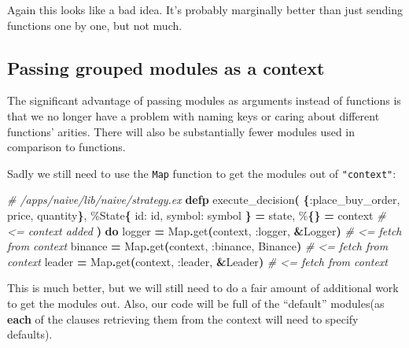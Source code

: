 \documentclass[
  oneside]{book}
\newenvironment{Shaded}{\begin{snugshade}}{\end{snugshade}}
\newcommand{\CommentTok}[1]{\textcolor[rgb]{0.56,0.35,0.01}{\textit{#1}}}
\newcommand{\ConstantTok}[1]{\textcolor[rgb]{0.56,0.35,0.01}{#1}}
\newcommand{\FunctionTok}[1]{\textcolor[rgb]{0.13,0.29,0.53}{\textbf{#1}}}
\newcommand{\KeywordTok}[1]{\textcolor[rgb]{0.13,0.29,0.53}{\textbf{#1}}}
\newcommand{\NormalTok}[1]{#1}
\newcommand{\OperatorTok}[1]{\textcolor[rgb]{0.81,0.36,0.00}{\textbf{#1}}}
\newcommand{\VariableTok}[1]{\textcolor[rgb]{0.00,0.00,0.00}{#1}}
\begin{document}
Again this looks like a bad idea. It's probably marginally better than just sending functions one by one, but not much.

\subsection{Passing grouped modules as a context}\label{passing-grouped-modules-as-a-context}

The significant advantage of passing modules as arguments instead of functions is that we no longer have a problem with naming keys or caring about different functions' arities. There will also be substantially fewer modules used in comparison to functions.

Sadly we still need to use the \texttt{Map} function to get the modules out of \texttt{"context"}:

\begin{Shaded}
\begin{Highlighting}[]
\CommentTok{\# /apps/naive/lib/naive/strategy.ex}
  \KeywordTok{defp}\NormalTok{ execute\_decision}\FunctionTok{(}
        \FunctionTok{\{}\VariableTok{:place\_buy\_order}\NormalTok{, price, quantity}\FunctionTok{\}}\NormalTok{,}
\NormalTok{        \%}\ConstantTok{State}\FunctionTok{\{}
          \VariableTok{id:}\NormalTok{ id,}
          \VariableTok{symbol:}\NormalTok{ symbol}
        \FunctionTok{\}} \OperatorTok{=}\NormalTok{ state,}
\NormalTok{        \%}\FunctionTok{\{\}} \OperatorTok{=}\NormalTok{ context }\CommentTok{\# \textless{}= context added}
      \FunctionTok{)} \KeywordTok{do}
\NormalTok{    logger }\OperatorTok{=} \ConstantTok{Map}\OperatorTok{.}\NormalTok{get}\FunctionTok{(}\NormalTok{context, }\VariableTok{:logger}\NormalTok{, }\OperatorTok{\&}\ConstantTok{Logger}\FunctionTok{)} \CommentTok{\# \textless{}= fetch from context}
\NormalTok{    binance }\OperatorTok{=} \ConstantTok{Map}\OperatorTok{.}\NormalTok{get}\FunctionTok{(}\NormalTok{context, }\VariableTok{:binance}\NormalTok{, }\ConstantTok{Binance}\FunctionTok{)} \CommentTok{\# \textless{}= fetch from context}
\NormalTok{    leader }\OperatorTok{=} \ConstantTok{Map}\OperatorTok{.}\NormalTok{get}\FunctionTok{(}\NormalTok{context, }\VariableTok{:leader}\NormalTok{, }\OperatorTok{\&}\ConstantTok{Leader}\FunctionTok{)} \CommentTok{\# \textless{}= fetch from context}
\end{Highlighting}
\end{Shaded}

This is much better, but we will still need to do a fair amount of additional work to get the modules out. Also, our code will be full of the ``default'' modules(as \textbf{each} of the clauses retrieving them from the context will need to specify defaults).
\end{document}
